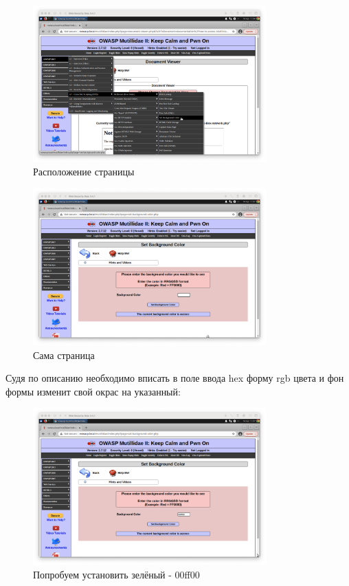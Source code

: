 \documentclass[a4paper]{article}
\begin{document}
  \begin{figure}[H]
    \centering
    \includegraphics[width=0.8\textwidth]{step_00002}
    \caption{Расположение страницы}
  \end{figure}

  \begin{figure}[H]
    \centering
    \includegraphics[width=0.8\textwidth]{step_00003}
    \caption{Сама страница}
  \end{figure}

  Судя по описанию необходимо вписать в поле ввода hex форму rgb цвета и
  фон формы изменит свой окрас на указанный:

  \begin{figure}[H]
    \centering
    \includegraphics[width=0.8\textwidth]{step_00004}
    \caption{Попробуем установить зелёный - 00ff00}
  \end{figure}
\end{document}
